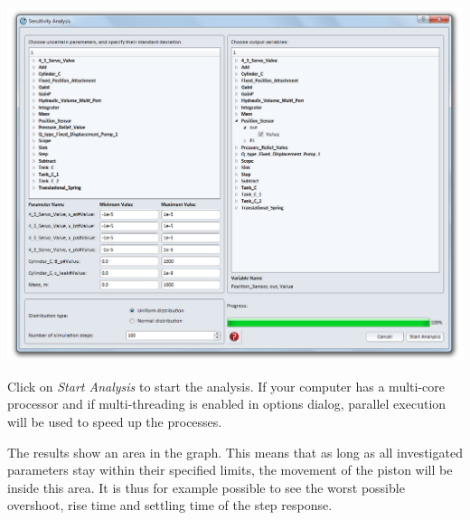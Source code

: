 \documentclass[a4paper,pdftex]{article}
\begin{document}
\begin{enumerate}
\includegraphics[width=\linewidth]{gfx/sensitivityanalysis/dialog.png}

Click on \textit{Start Analysis} to start the analysis. If your computer has a multi-core processor and if multi-threading is enabled in options dialog, parallel execution will be used to speed up the processes.

The results show an area in the graph. This means that as long as all investigated parameters stay within their specified limits, the movement of the piston will be inside this area. It is thus for example possible to see the worst possible overshoot, rise time and settling time of the step response.

\end{enumerate}
\end{document}
